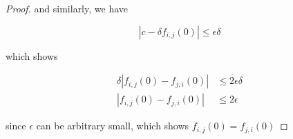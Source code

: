 \begin{proof}
    and similarly, we have

    \[
       \left| c - \delta f_{i,j}(0) \right| \le \epsilon \delta
    \]

    which shows

    \begin{align*}
        \delta\left| f_{i,j}(0) - f_{j,i}(0)\right| &\le 2\epsilon \delta \\
        \left| f_{i,j}(0) - f_{j,i}(0)\right| & \le 2\epsilon 
    \end{align*}

    since $\epsilon$ can be arbitrary small, which shows $f_{i,j}(0) = f_{j,i}(0)$

\end{proof}